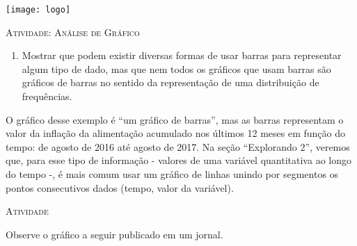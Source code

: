\documentclass[10 pt,usenames,dvipsnames, oneside]{article}
\begin{document}
\begin{center}
  \begin{minipage}[l]{3cm}
\texttt{[image: logo]}    
\end{minipage}\hfill
\begin{minipage}[r]{.8\textwidth}
 {\Large \scshape Atividade: Análise de Gráfico}  
\end{minipage}
\end{center}
\vspace{.2cm}

\ifdefined\prof
\begin{objetivos}
\item
\end{objetivos}

\begin{goals}
\begin{enumerate}
\item Mostrar que podem existir diversas formas de usar barras para representar algum tipo de dado, mas que nem todos os gráficos que usam barras são gráficos de barras no sentido da representação de uma distribuição de frequências.
\end{enumerate}

\tcblower

O gráfico desse exemplo é “um gráfico de barras”, mas as barras representam o valor da inflação da alimentação acumulado nos últimos 12 meses em função do tempo: de agosto de 2016 até agosto de 2017. Na seção “Explorando 2”, veremos que, para esse tipo de informação - valores de uma variável quantitativa ao longo do tempo -, é mais comum usar um gráfico de linhas unindo por segmentos os pontos consecutivos dados (tempo, valor da variável).

\end{goals}

\bigskip
\begin{center}
{\large \scshape Atividade}
\end{center}
\fi

Observe o gráfico a seguir publicado em um jornal.
\end{document}
